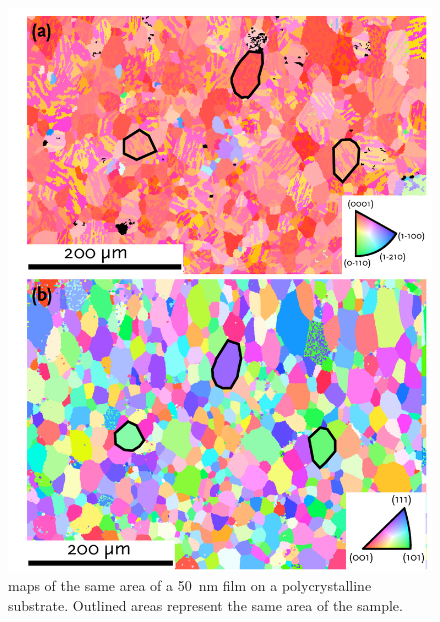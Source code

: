 \begin{figure}
\begin{center}
	\includegraphics[width=\textwidth]{subfilmmaps.pdf}
		\caption[ maps of film and substrate]{%
			 maps of the same area of a \SI{50}{\nano\meter}
			 film on a polycrystalline  substrate.
			Outlined areas represent the same area of the sample.}
	\label{fig:subfilmmaps}
\end{center}
\end{figure}

